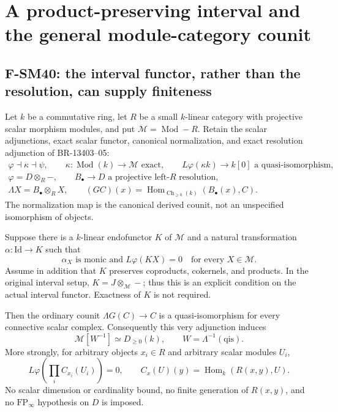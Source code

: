\section{A product-preserving interval and the general module-category counit}

\subsection{F-SM40: the interval functor, rather than the resolution, can supply finiteness}

Let \(k\) be a commutative ring, let \(R\) be a small
\(k\)-linear category with projective scalar morphism modules,
and put \(\mathcal M=\operatorname{Mod}\!-\!R\).
Retain the scalar adjunctions, exact scalar functor, canonical
normalization, and exact resolution adjunction of BR-13403--05:
\[
 \begin{gathered}
 \varphi\dashv\kappa\dashv\psi,\qquad
 \kappa:\operatorname{Mod}(k)\longrightarrow\mathcal M
       \text{ exact},\qquad
 L\varphi(\kappa k)\longrightarrow k[0]\text{ a quasi-isomorphism},\\
 \varphi=D\otimes_R-,\qquad B_\bullet\longrightarrow D
       \text{ a projective left-}R\text{ resolution},\\
 \Lambda X=B_\bullet\otimes_R X,\qquad
 (GC)(x)=\operatorname{Hom}_{\operatorname{Ch}_{\ge0}(k)}
                                  (B_\bullet(x),C).
 \end{gathered}                                                \tag{SM40.1}
\]
The normalization map is the canonical derived counit, not
an unspecified isomorphism of objects.

Suppose there is a \(k\)-linear endofunctor \(K\) of
\(\mathcal M\) and a natural transformation
\(\alpha:\mathrm{Id}\to K\) such that
\[
 \alpha_X\text{ is monic and }L\varphi(KX)=0
                 \quad\text{for every }X\in\mathcal M.       \tag{SM40.2}
\]
Assume in addition that \(K\) preserves coproducts,
cokernels, and products.  In the original interval setup,
\(K=J\otimes_{\mathcal M}-\); thus this is an explicit
condition on the actual interval functor.  Exactness of
\(K\) is not required.

Then the ordinary counit \(\Lambda G(C)\to C\) is a
quasi-isomorphism for every connective scalar complex.
Consequently this very adjunction induces
\[
 \mathcal M[W^{-1}]\simeq D_{\ge0}(k),\qquad
                  W=\Lambda^{-1}(\mathrm{qis}).              \tag{SM40.3}
\]
More strongly, for arbitrary objects \(x_i\in R\) and
arbitrary scalar modules \(U_i\),
\[
 L\varphi\!\left(\prod_i C_{x_i}(U_i)\right)=0,
 \qquad C_x(U)(y)=\operatorname{Hom}_k(R(x,y),U).              \tag{SM40.4}
\]
No scalar dimension or cardinality bound, no finite generation
of \(R(x,y)\), and no \(\mathrm{FP}_\infty\) hypothesis on
\(D\) is imposed.

